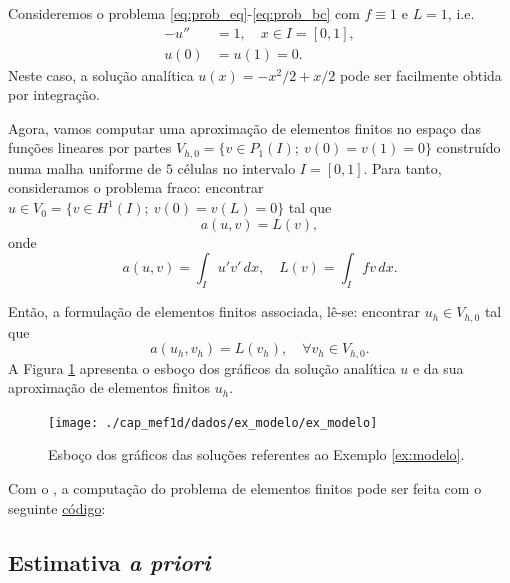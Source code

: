 \begin{ex}\label{ex:modelo}
  Consideremos o problema \eqref{eq:prob_eq}-\eqref{eq:prob_bc} com $f\equiv 1$ e $L=1$, i.e.
  \begin{align}
    -u'' &= 1,\quad x\in I=[0,1],\label{eq:ex_modelo_eq}\\
    u(0) &= u(1) = 0.\label{eq:ex_modelo_bc}
  \end{align}
Neste caso, a solução analítica $u(x) = -x^2/2+x/2$ pode ser facilmente obtida por integração.

Agora, vamos computar uma aproximação de elementos finitos no espaço das funções lineares por partes $V_{h,0} = \{v\in P_1(I);~v(0)=v(1)=0\}$ construído numa malha uniforme de $5$ células no intervalo $I=[0, 1]$. Para tanto, consideramos o problema fraco: encontrar $u\in V_0 = \{v\in H^1(I);~v(0)=v(L)=0\}$ tal que
\begin{equation}
  a(u, v) = L(v),
\end{equation}
onde
\begin{equation}
  a(u, v) = \int_I u'v'\,dx,\quad L(v)=\int_I fv\,dx.
\end{equation}

Então, a formulação de elementos finitos associada, lê-se: encontrar $u_h\in V_{h,0}$ tal que
\begin{equation}
  a(u_h, v_h) = L(v_h),\quad\forall v_h\in V_{h,0}.
\end{equation}
A Figura \ref{fig:ex_modelo} apresenta o esboço dos gráficos da solução analítica $u$ e da sua aproximação de elementos finitos $u_h$.

\begin{figure}[h!]
  \centering
  \texttt{[image: ./cap\_mef1d/dados/ex\_modelo/ex\_modelo]}
  \caption{Esboço dos gráficos das soluções referentes ao Exemplo \ref{ex:modelo}.}
  \label{fig:ex_modelo}
\end{figure}

\ifispython
Com o \fenics, a computação do problema de elementos finitos pode ser feita com o seguinte \href{https://github.com/phkonzen/notas/blob/master/src/MetodoElementosFinitos/cap_mef1d/dados/ex_modelo/ex_modelo.py}{código}:

\fi
\end{ex}

\subsection{Estimativa {\it a priori}}


